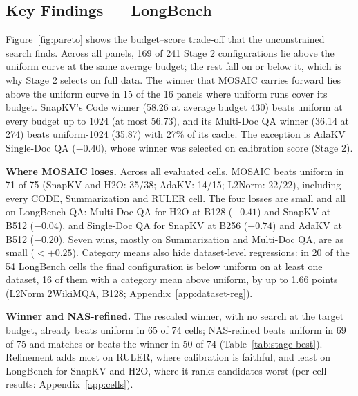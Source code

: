 \documentclass[11pt]{article}
\begin{document}
\subsection{Key Findings — LongBench}
\label{sec:which-stage}

Figure~\ref{fig:pareto} shows the budget--score trade-off that the unconstrained search finds. Across all panels, 169 of 241 Stage 2 configurations lie above the uniform curve at the same average budget; the rest fall on or below it, which is why Stage 2 selects on full data. The winner that MOSAIC carries forward lies above the uniform curve in 15 of the 16 panels where uniform runs cover its budget. SnapKV's Code winner (58.26 at average budget 430) beats uniform at every budget up to 1024 (at most 56.73), and its Multi-Doc QA winner (36.14 at 274) beats uniform-1024 (35.87) with 27\% of its cache. The exception is AdaKV Single-Doc QA ($-0.40$), whose winner was selected on calibration score (Stage 2).

\textbf{Where MOSAIC loses.} Across all evaluated cells, MOSAIC beats uniform in 71 of 75 (SnapKV and H2O: 35/38; AdaKV: 14/15; L2Norm: 22/22), including every CODE, Summarization and RULER cell. The four losses are small and all on LongBench QA: Multi-Doc QA for H2O at B128 ($-0.41$) and SnapKV at B512 ($-0.04$), and Single-Doc QA for SnapKV at B256 ($-0.74$) and AdaKV at B512 ($-0.20$). Seven wins, mostly on Summarization and Multi-Doc QA, are as small ($<+0.25$). Category means also hide dataset-level regressions: in 20 of the 54 LongBench cells the final configuration is below uniform on at least one dataset, 16 of them with a category mean above uniform, by up to 1.66 points (L2Norm 2WikiMQA, B128; Appendix~\ref{app:dataset-reg}).

\textbf{Winner and NAS-refined.} The rescaled winner, with no search at the target budget, already beats uniform in 65 of 74 cells; NAS-refined beats uniform in 69 of 75 and matches or beats the winner in 50 of 74 (Table~\ref{tab:stage-best}). Refinement adds most on RULER, where calibration is faithful, and least on LongBench for SnapKV and H2O, where it ranks candidates worst (per-cell results: Appendix~\ref{app:cells}).
\end{document}
